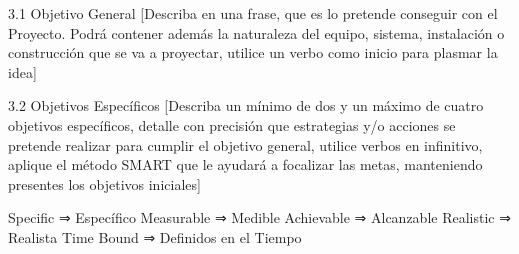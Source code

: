 3.1	Objetivo General [Describa en una frase, que es lo pretende conseguir con el Proyecto. Podrá contener además la naturaleza del equipo, sistema, instalación o construcción que se va a proyectar, utilice un verbo como inicio para plasmar la idea]

3.2	Objetivos Específicos [Describa un mínimo de dos y un máximo de cuatro objetivos específicos, detalle con precisión que estrategias y/o acciones se pretende realizar para cumplir el objetivo general, utilice verbos en infinitivo, aplique el método SMART que le ayudará a focalizar las metas, manteniendo presentes los objetivos iniciales]

Specific ⇒ Específico
Measurable ⇒ Medible
Achievable ⇒ Alcanzable
Realistic ⇒ Realista
Time Bound ⇒ Definidos en el Tiempo
